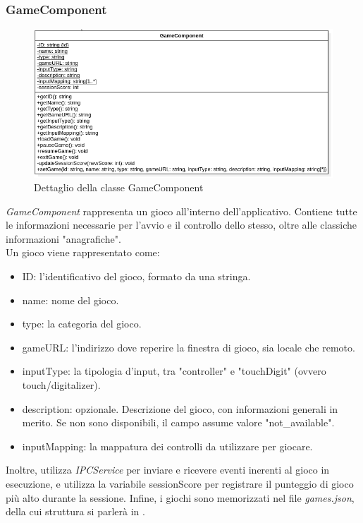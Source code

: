 \subsubsection{GameComponent}
\label{subsec:gameComponent}
\begin{figure}[h]
    \centering
    \includegraphics[width=340pt]{images/prog/Game.png}
    \caption{Dettaglio della classe GameComponent}
    \label{fig:gameComponent}
\end{figure}
\emph{GameComponent} rappresenta un gioco all'interno dell'applicativo. Contiene tutte le informazioni necessarie per l'avvio e il controllo dello stesso, oltre alle classiche informazioni "anagrafiche".\\
Un gioco viene rappresentato come:
\begin{itemize}
    \item ID: l'identificativo del gioco, formato da una stringa.
    \item name: nome del gioco.
    \item type: la categoria del gioco.
    \item gameURL: l'indirizzo dove reperire la finestra di gioco, sia locale che remoto.
    \item inputType: la tipologia d'input, tra "controller" e "touchDigit" (ovvero touch/digitalizer).
    \item description: opzionale. Descrizione del gioco, con informazioni generali in merito. Se non sono disponibili, il campo assume valore "not_available".
    \item inputMapping: la mappatura dei controlli da utilizzare per giocare.
\end{itemize}
Inoltre, utilizza \emph{IPCService} per inviare e ricevere eventi inerenti al gioco in esecuzione, e utilizza la variabile sessionScore per registrare il punteggio di gioco più alto durante la sessione.
Infine, i giochi sono memorizzati nel file \emph{games.json}, della cui struttura si parlerà in . 

